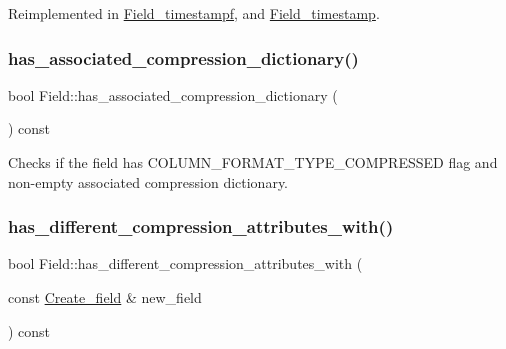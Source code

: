 Reimplemented in \mbox{\hyperlink{classField__timestampf_a72149682778248e2084a68f08738c3a6}{Field\+\_\+timestampf}}, and \mbox{\hyperlink{classField__timestamp_a462bff06ee84cafedf33b0a23d56a0f2}{Field\+\_\+timestamp}}.

\mbox{\label{classField_a7a242ebc5829a40ee3bf17a2cf06cf94}} 
\subsubsection{\texorpdfstring{has\+\_\+associated\+\_\+compression\+\_\+dictionary()}{has\_associated\_compression\_dictionary()}}
{\footnotesize\ttfamily bool Field\+::has\+\_\+associated\+\_\+compression\+\_\+dictionary (\begin{DoxyParamCaption}{ }\end{DoxyParamCaption}) const\hspace{0.3cm}{\ttfamily [inline]}}

Checks if the field has C\+O\+L\+U\+M\+N\+\_\+\+F\+O\+R\+M\+A\+T\+\_\+\+T\+Y\+P\+E\+\_\+\+C\+O\+M\+P\+R\+E\+S\+S\+ED flag and non-\/empty associated compression dictionary. \mbox{\label{classField_a05e0489ef2245b6f3e7f6d172569f36e}} 
\subsubsection{\texorpdfstring{has\+\_\+different\+\_\+compression\+\_\+attributes\+\_\+with()}{has\_different\_compression\_attributes\_with()}}
{\footnotesize\ttfamily bool Field\+::has\+\_\+different\+\_\+compression\+\_\+attributes\+\_\+with (\begin{DoxyParamCaption}\item[{const \mbox{\hyperlink{classCreate__field}{Create\+\_\+field}} \&}]{new\+\_\+field }\end{DoxyParamCaption}) const\hspace{0.3cm}{\ttfamily [protected]}}

